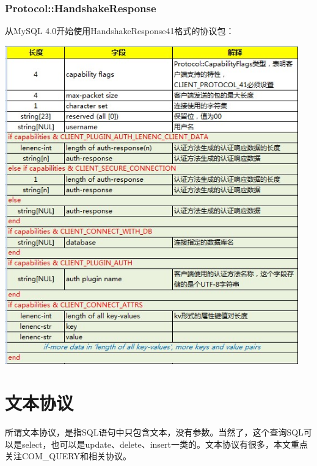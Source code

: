 \documentclass[a4paper, titlepage, 10pt, bookmark]{article}
\begin{document}
\subsubsection{Protocol::HandshakeResponse}
从MySQL 4.0开始使用HandshakeResponse41格式的协议包：
\begin{center}
\includegraphics[width=5in]{010.jpg}
\end{center}

\newpage









\section{文本协议}
所谓文本协议，是指SQL语句中只包含文本，没有参数。当然了，这个查询SQL可以是select，也可以是update、delete、insert一类的。文本协议有很多，本文重点关注COM\_QUERY和相关协议。
\end{document}
